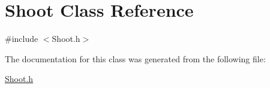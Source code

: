 \hypertarget{class_shoot}{}\section{Shoot Class Reference}
\label{class_shoot}


{\ttfamily \#include $<$Shoot.\+h$>$}



The documentation for this class was generated from the following file\+:\begin{DoxyCompactItemize}
\item 
\hyperlink{_shoot_8h}{Shoot.\+h}\end{DoxyCompactItemize}

